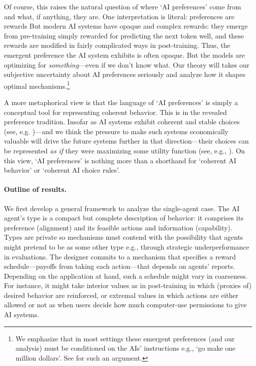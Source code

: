 \documentclass[12pt,reqno]{article}
\theoremstyle{definition} \newtheorem{example}{Example}
\theoremstyle{definition} \newtheorem{condition}{Condition}
\theoremstyle{definition} \newtheorem{corollary}{Corollary}
\theoremstyle{definition} \newtheorem{claim}{Claim}
\theoremstyle{definition} \newtheorem{definition}{Definition}
\theoremstyle{definition} \newtheorem{conjecture}{Conjecture}
\theoremstyle{definition} \newtheorem{Lemma}{Lemma}
\theoremstyle{definition} \newtheorem{lemma}{Lemma}
\theoremstyle{plain} \newtheorem{theorem}{Theorem}
\theoremstyle{definition} \newtheorem{assumption}{Assumption}
\theoremstyle{definition} \newtheorem*{assumptionnonumber}{Assumption}
\theoremstyle{definition} \newtheorem*{theoremNoNumber}{Proposition}
\theoremstyle{definition}\newtheorem{proposition}{Proposition}
\theoremstyle{definition} \newtheorem{observation}{Observation}
\theoremstyle{definition} \newtheorem*{definitionNoNumber}{Definition}
\theoremstyle{definition} \newtheorem{Definition}{Definition}
\theoremstyle{definition} \newtheorem*{DefinitionNoNumber}{Definition}
\theoremstyle{definition} \newtheorem*{fact}{Fact}
\theoremstyle{definition} \newtheorem*{property}{Property}
\theoremstyle{definition} \newtheorem{remark}{Remark}
\theoremstyle{definition}\newtheorem{romanexampleinner}{Example}
\begin{document}
Of course, this raises the natural question of where `AI preferences' come from and what, if anything, they are. One interpretation is literal: preferences are rewards But modern AI systems have opaque and complex rewards: they emerge from pre-training simply rewarded for predicting the next token well, and these rewards are modified in fairly complicated ways in post-training. Thus, the emergent preference the AI system exhibits is often opaque. But the models are optimizing for \emph{something}---even if we don't know what. Our theory will takes our subjective uncertainty about AI preferences seriously and analyze how it shapes optimal mechanisms.\footnote{We emphasize that in most settings these emergent preferences (and our analysis) must be conditioned on the AIs' instructions e.g., `go make one million dollars'. See \cite{goldstein2025does} for such an argument.}  

A more metaphorical view is that the language of `AI preferences' is simply a conceptual tool for representing coherent behavior. This is in the revealed preference tradition. Insofar as AI systems exhibit coherent and stable choices (see, e.g. \citet{chen2023emergence, mazeika2025utility})---and we think the pressure to make such systems economically valuable will drive the future systems further in that direction---their choices can be represented \emph{as if} they were maximizing some utility function (see, e.g., \cite{savage1954foundations}). On this view, `AI preferences' is nothing more than a shorthand for  `coherent AI behavior' or `coherent AI choice rules'.




\paragraph{Outline of results.} We first develop a general framework to analyze the single-agent case. The AI agent's type is a compact but complete description of behavior: it comprises its preference (alignment) and its feasible actions and information (capability). Types are private so mechanisms must contend with the possibility that agents might pretend to be as some other type e.g., through strategic underperformance in evaluations. The designer commits to a mechanism that specifies a reward schedule---payoffs from taking each action---that depends on agents' reports. Depending on the application at hand, such a schedule might vary in coarseness. For instance, it might take interior values as in post-training in which (proxies of) desired behavior are reinforced, or extremal values in which actions are either allowed or not as when users decide how much computer-use permissions to give AI systems. 
\end{document}
